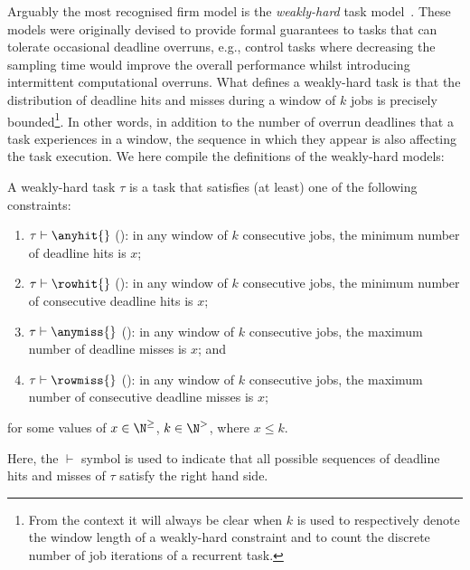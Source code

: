 Arguably the most recognised firm model is the \emph{weakly-hard} task model~\cite{Bernat:2001}.
These models were originally devised to provide formal guarantees to tasks that can tolerate occasional deadline overruns, e.g., control tasks where decreasing the sampling time would improve the overall performance whilst introducing intermittent computational overruns.
What defines a weakly-hard task is that the distribution of deadline hits and misses during a window of $k$ jobs is precisely bounded\footnote{From the context it will always be clear when $k$ is used to respectively denote the window length of a weakly-hard constraint and to count the discrete number of job iterations of a recurrent task.}.
In other words, in addition to the number of overrun deadlines that a task experiences in a window, the sequence in which they appear is also affecting the task execution.
We here compile the definitions of the weakly-hard models:
%
\begin{definition}%
\label{def:kappa:weakly-hard}%
    A weakly-hard task $\tau$ is a task that satisfies (at least) one of the following constraints:
    \begin{enumerate}[label=(\roman*)]
        \item \label{item:AnyHit} $\tau \vdash \anyhit{}$ (\tAH{}): in any window of $k$ consecutive jobs, the minimum number of deadline hits is $x$;
        \item \label{item:RowHit} $\tau \vdash \rowhit{}$ (\tRH{}): in any window of $k$ consecutive jobs, the minimum number of consecutive deadline hits is $x$;
        \item \label{item:AnyMiss} $\tau \vdash \anymiss{}$ (\tAM{}): in any window of $k$ consecutive jobs, the maximum number of deadline misses is $x$; and
        \item \label{item:RowMiss} $\tau \vdash \rowmiss{}$ (\tRM{}): in any window of $k$ consecutive jobs, the maximum number of consecutive deadline misses is $x$;
    \end{enumerate}
    for some values of $x\in \N^\geq$, $k \in \N^>$, where $x\leq k$.
\end{definition}
%
Here, the $\vdash$ symbol is used to indicate that all possible sequences of deadline hits and misses of $\tau$ satisfy the right hand side.

